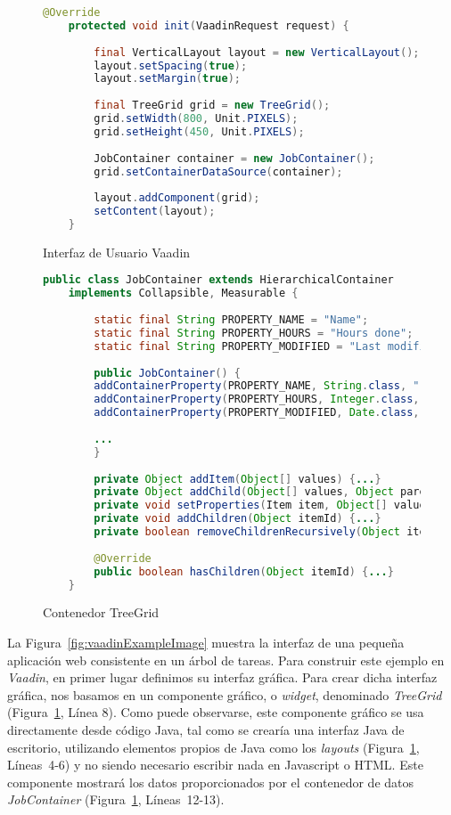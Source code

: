 \begin{figure}[H]
	\centering
	\begin{lstlisting}[language=Java]
	@Override
	protected void init(VaadinRequest request) {
	
		final VerticalLayout layout = new VerticalLayout();
		layout.setSpacing(true);
		layout.setMargin(true);
		
		final TreeGrid grid = new TreeGrid();
		grid.setWidth(800, Unit.PIXELS);
		grid.setHeight(450, Unit.PIXELS);
		
		JobContainer container = new JobContainer();
		grid.setContainerDataSource(container);
		
		layout.addComponent(grid);
		setContent(layout);
	}\end{lstlisting}
	\vspace{-15pt}
	\caption{Interfaz de Usuario Vaadin}
	\label{fig:uiVaadin}
\end{figure}

\begin{figure}[H]
	\centering
	\begin{lstlisting}[language=Java]
	public class JobContainer extends HierarchicalContainer
	implements Collapsible, Measurable {
	
		static final String PROPERTY_NAME = "Name";
		static final String PROPERTY_HOURS = "Hours done";
		static final String PROPERTY_MODIFIED = "Last modified";
		
		public JobContainer() {
		addContainerProperty(PROPERTY_NAME, String.class, "");
		addContainerProperty(PROPERTY_HOURS, Integer.class, 0);
		addContainerProperty(PROPERTY_MODIFIED, Date.class, new Date());
		
		...	
		}
		
		private Object addItem(Object[] values) {...}
		private Object addChild(Object[] values, Object parentId) {...}
		private void setProperties(Item item, Object[] values) {...}
		private void addChildren(Object itemId) {...}
		private boolean removeChildrenRecursively(Object itemId) {...}
		
		@Override
		public boolean hasChildren(Object itemId) {...}
	}
	\end{lstlisting}
	\caption{Contenedor TreeGrid}
	\label{fig:jobContainer}
\end{figure}

La Figura~\ref{fig:vaadinExampleImage} muestra la interfaz de una pequeña aplicación web consistente en un árbol de tareas. Para construir este ejemplo en \emph{Vaadin}, en primer lugar definimos su interfaz gráfica. Para crear dicha interfaz gráfica, nos basamos en un componente gráfico, o \emph{widget}, denominado \emph{TreeGrid}  (Figura~\ref{fig:uiVaadin}, Línea 8). Como puede observarse, este componente gráfico se usa directamente desde código Java, tal como se crearía una interfaz Java de escritorio, utilizando elementos propios de Java como los \emph{layouts} (Figura~\ref{fig:uiVaadin}, Líneas~4-6) y no siendo necesario escribir nada en Javascript o HTML. Este componente mostrará los datos proporcionados por el contenedor de datos \emph{JobContainer} (Figura~\ref{fig:uiVaadin}, Líneas~12-13).

